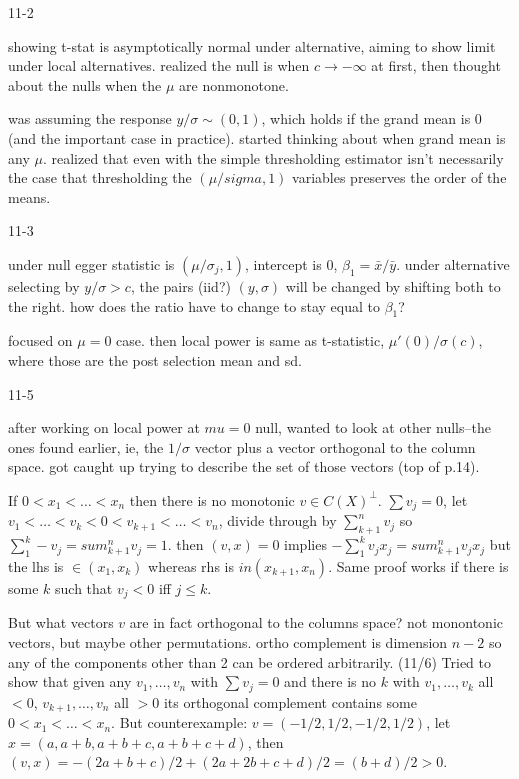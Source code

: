 \documentclass{article}
\begin{document}
11-2

showing t-stat is asymptotically normal under alternative, aiming to
show limit under local alternatives. realized the null is when $c\to
-\infty$ at first, then thought about the nulls when the $\mu$ are
nonmonotone.

was assuming the response $y/\sigma \sim (0,1)$, which holds if the
grand mean is 0 (and the important case in practice). started thinking
about when grand mean is any $\mu$. realized that even with the simple
thresholding estimator isn't necessarily the case that thresholding
the $(\mu/sigma, 1)$ variables preserves the order of the means.


11-3

under null egger statistic is $(\mu/\sigma_j,1)$, intercept is $0$,
$\beta_1=\bar{x}/\bar{y}$. under alternative selecting by $y/\sigma >
c$, the pairs (iid?) $(y,\sigma)$ will be changed by shifting both to
the right. how does the ratio have to change to stay equal to
$\beta_1$?

focused on $\mu=0$ case. then local power is same as t-statistic,
$\mu'(0)/\sigma(c)$, where those are the post selection mean and sd.

11-5

after working on local power at $mu=0$ null, wanted to look at other
nulls--the ones found earlier, ie, the $1/\sigma$ vector plus a vector
orthogonal to the column space. got caught up trying to describe the
set of those vectors (top of p.14).

If $0<x_1<\ldots<x_n$ then there is no monotonic $v\in
C(X)^{\perp}$. $\sum v_j=0$, let
$v_1<\ldots<v_k<0<v_{k+1}<\ldots<v_n$, divide through by
$\sum_{k+1}^nv_j$ so $\sum_1^k-v_j=sum_{k+1}^nv_j=1$. then $(v,x)=0$
implies $-\sum_1^kv_jx_j=sum_{k+1}^nv_jx_j$ but the lhs is $\in
(x_1,x_k)$ whereas rhs is $in (x_{k+1},x_n)$. Same proof works if
there is some $k$ such that $v_j<0$ iff $j\le k$.

But what vectors $v$ are in fact orthogonal to the columns space? not
monontonic vectors, but maybe other permutations. ortho complement is
dimension $n-2$ so any of the components other than 2 can be ordered
arbitrarily. (11/6) Tried to show that given any $v_1,\ldots,v_n$ with
$\sum v_j=0$ and there is no $k$ with $v_1,\ldots,v_k$ all $<0$,
$v_{k+1},\ldots,v_n$ all $>0$ its orthogonal complement contains some
$0<x_1<\ldots<x_n$. But counterexample: $v=(-1/2,1/2,-1/2,1/2)$, let
$x=(a,a+b,a+b+c,a+b+c+d)$, then
$(v,x)=-(2a+b+c)/2 + (2a+2b+c+d)/2=(b+d)/2>0$.
\end{document}
